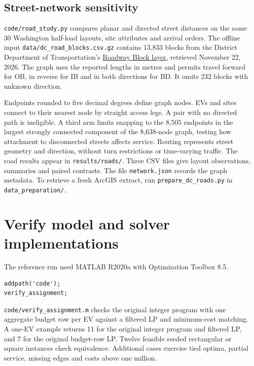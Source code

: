 \documentclass[11pt,a4paper]{article}
\begin{document}
\subsection*{Street-network sensitivity}
\texttt{code/road\_study.py} compares planar and directed street distances on the same 30 Washington half-load layouts, site attributes and arrival orders. The offline input \texttt{data/dc\_road\_blocks.csv.gz} contains 13,833 blocks from the District Department of Transportation's \href{https://catalog.data.gov/dataset/roadway-block}{Roadway Block layer}, retrieved November 22, 2026. The graph uses the reported lengths in metres and permits travel forward for OB, in reverse for IB and in both directions for BD. It omits 232 blocks with unknown direction.

Endpoints rounded to five decimal degrees define graph nodes. EVs and sites connect to their nearest node by straight access legs. A pair with no directed path is ineligible. A third arm limits snapping to the 8,505 endpoints in the largest strongly connected component of the 8,638-node graph, testing how attachment to disconnected streets affects service. Routing represents street geometry and direction, without turn restrictions or time-varying traffic.
The road results appear in \texttt{results/roads/}. Three CSV files give layout observations, summaries and paired contrasts. The file \texttt{network.json} records the graph metadata. To retrieve a fresh ArcGIS extract, run \texttt{prepare\_dc\_roads.py} in \texttt{data\_preparation/}.

\section*{Verify model and solver implementations}
The reference run used MATLAB R2020a with Optimization Toolbox 8.5.
\begin{lstlisting}
addpath('code');
verify_assignment;
\end{lstlisting}
\texttt{code/verify\_assignment.m} checks the original integer program with one aggregate budget row per EV against a filtered LP and minimum-cost matching. A one-EV example returns 11 for the original integer program and filtered LP, and 7 for the original budget-row LP. Twelve feasible seeded rectangular or square instances check equivalence. Additional cases exercise tied optima, partial service, missing edges and costs above one million.
\end{document}
